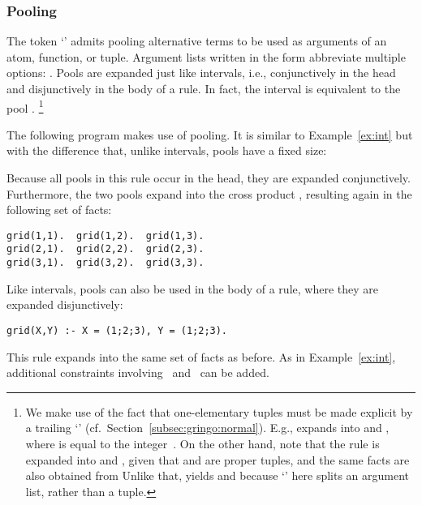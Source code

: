 \subsubsection{Pooling}\label{subsec:gringo:pool}

The token `\code{;}' admits pooling alternative terms
to be used as arguments of an atom, function, or tuple.
Argument lists written in the form  abbreviate multiple options:
.
Pools are expanded just like intervals, i.e.,
conjunctively in the head and disjunctively in the body of a rule.
In fact, the interval  is equivalent to the pool .%
\footnote{%
We make use of the fact that one-elementary tuples
must be made explicit by a trailing `\code{,}' (cf.\ Section~\ref{subsec:gringo:normal}).
E.g.,  expands into  and ,
where  is equal to the integer~.
On the other hand, note that the rule
is expanded into 
 and ,
given that  and  are proper tuples,
and the same facts are also obtained from
Unlike that,  yields
 and 
because `\code{;}' here splits an argument list,
rather than a tuple.}
\begin{example}\label{ex:pool}
The following program makes use of pooling.
It is similar to Example~\ref{ex:int}
but with the difference that, unlike intervals, pools have a fixed size:%

%
Because all pools in this rule occur in the head,
they are expanded conjunctively.
Furthermore, the two pools expand into the cross product ,
resulting again in the following set of facts:
\begin{lstlisting}[numbers=none]
grid(1,1).  grid(1,2).  grid(1,3).
grid(2,1).  grid(2,2).  grid(2,3).
grid(3,1).  grid(3,2).  grid(3,3).
\end{lstlisting}
Like intervals, pools can also be used in the body of a rule,
where they are expanded disjunctively:
\begin{lstlisting}
grid(X,Y) :- X = (1;2;3), Y = (1;2;3).
\end{lstlisting}
This rule expands into the same set of facts as before.
As in Example~\ref{ex:int}, additional constraints involving~ and~ can be added.
\end{example}

